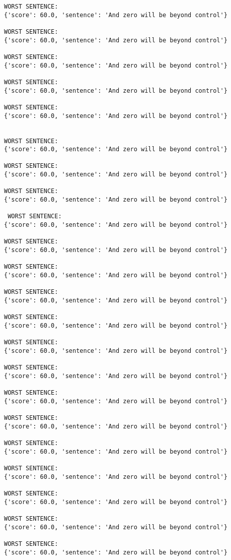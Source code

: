 \documentclass[12pt,a4paper,oneside]{book}
\begin{document}
\begin{verbatim}
WORST SENTENCE:
{'score': 60.0, 'sentence': 'And zero will be beyond control'}

WORST SENTENCE:
{'score': 60.0, 'sentence': 'And zero will be beyond control'}

WORST SENTENCE:
{'score': 60.0, 'sentence': 'And zero will be beyond control'}

WORST SENTENCE:
{'score': 60.0, 'sentence': 'And zero will be beyond control'}

WORST SENTENCE:
{'score': 60.0, 'sentence': 'And zero will be beyond control'}
 
 
WORST SENTENCE:
{'score': 60.0, 'sentence': 'And zero will be beyond control'}

WORST SENTENCE:
{'score': 60.0, 'sentence': 'And zero will be beyond control'}

WORST SENTENCE:
{'score': 60.0, 'sentence': 'And zero will be beyond control'}

 WORST SENTENCE:
{'score': 60.0, 'sentence': 'And zero will be beyond control'}

WORST SENTENCE:
{'score': 60.0, 'sentence': 'And zero will be beyond control'}

WORST SENTENCE:
{'score': 60.0, 'sentence': 'And zero will be beyond control'}

WORST SENTENCE:
{'score': 60.0, 'sentence': 'And zero will be beyond control'}

WORST SENTENCE:
{'score': 60.0, 'sentence': 'And zero will be beyond control'}

WORST SENTENCE:
{'score': 60.0, 'sentence': 'And zero will be beyond control'}

WORST SENTENCE:
{'score': 60.0, 'sentence': 'And zero will be beyond control'}

WORST SENTENCE:
{'score': 60.0, 'sentence': 'And zero will be beyond control'}

WORST SENTENCE:
{'score': 60.0, 'sentence': 'And zero will be beyond control'}

WORST SENTENCE:
{'score': 60.0, 'sentence': 'And zero will be beyond control'}

WORST SENTENCE:
{'score': 60.0, 'sentence': 'And zero will be beyond control'}

WORST SENTENCE:
{'score': 60.0, 'sentence': 'And zero will be beyond control'}

WORST SENTENCE:
{'score': 60.0, 'sentence': 'And zero will be beyond control'}

WORST SENTENCE:
{'score': 60.0, 'sentence': 'And zero will be beyond control'}


\end{verbatim}
\end{document}
